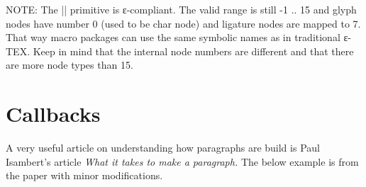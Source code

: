 NOTE: The |\lastnodetype| primitive is ε-\tex compliant. The valid range is still -1 .. 15 and glyph
nodes have number 0 (used to be char node) and ligature nodes are mapped to 7. That way macro
packages can use the same symbolic names as in traditional ε-TEX. Keep in mind that the internal node
numbers are different and that there are more node types than 15.

%


\section{Callbacks}

A very useful article on understanding how paragraphs are build is Paul Isambert's article \textit{What it takes to make a paragraph.} The below example is from the paper with minor modifications.


